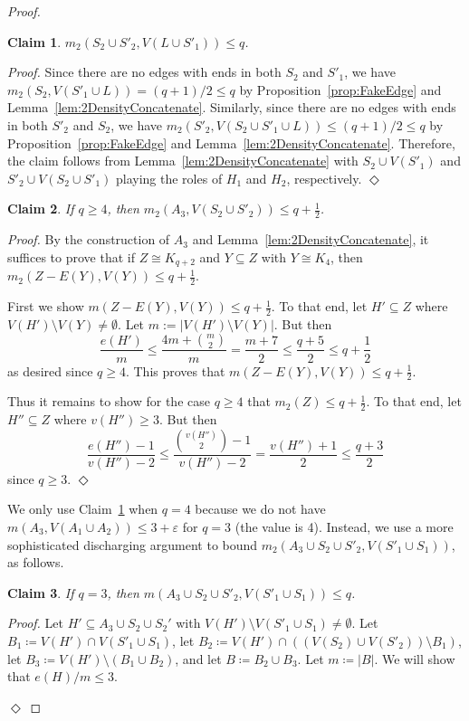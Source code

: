 \documentclass[11pt]{article}
\numberwithin{equation}{section}
\newcommand{\eps}{\varepsilon}
\newcounter{i}
\theoremstyle{plain}
\newtheorem{claim}{Claim}[thm]
\newenvironment{proofclaim}[1][]%
{\noindent \emph{Proof.} {}{#1}{}}{\hfill
	$\Diamond$\vspace{1em}}
\theoremstyle{plain} %
\theoremstyle{definition}
\begin{document}
\begin{proof}
\begin{claim}\label{cl:S_2andS'_2}
    $m_2(S_2 \cup S'_2, V(L \cup S'_1)) \leq q$.  
\end{claim}
\begin{proofclaim}
    Since there are no edges with ends in both $S_2$ and $S'_1$, we have $m_2(S_2, V(S'_1 \cup L)) = (q + 1)/2 \leq q$ by Proposition~\ref{prop:FakeEdge} and Lemma~\ref{lem:2DensityConcatenate}.
    Similarly, since there are no edges with ends in both $S'_2$ and $S_2$, we have $m_2(S'_2, V(S_2 \cup S'_1 \cup L)) \leq (q + 1)/2 \leq q$ by Proposition~\ref{prop:FakeEdge} and Lemma~\ref{lem:2DensityConcatenate}.
    Therefore, the claim follows from Lemma~\ref{lem:2DensityConcatenate} with $S_2 \cup V(S'_1)$ and $S'_2 \cup V(S_2 \cup S'_1)$ playing the roles of $H_1$ and $H_2$, respectively.
\end{proofclaim}

\begin{claim}\label{cl:A_3}
    If $q \geq 4$, then $m_2(A_3, V(S_2 \cup S'_2)) \leq q + \frac{1}{2}$.
\end{claim}
\begin{proofclaim}
    By the construction of $A_3$ and Lemma~\ref{lem:2DensityConcatenate}, it suffices to prove that if $Z\cong K_{q+2}$ and $Y\subseteq Z$ with $Y\cong K_4$, then $m_2(Z-E(Y),V(Y))\le q+\frac{1}{2}$. 

    First we show $m(Z-E(Y),V(Y))\le q+\frac{1}{2}$. To that end, let $H'\subseteq Z$ where $V(H')\setminus V(Y)\ne \emptyset$. Let $m:= |V(H')\setminus V(Y)|$. But then 
$$\frac{e(H')}{m} \le \frac{4m+\binom{m}{2}}{m} = \frac{m+7}{2} \le \frac{q+5}{2} \le q+\frac{1}{2}$$
as desired since $q\ge 4$. This proves that $m(Z-E(Y),V(Y))\le q+\frac{1}{2}$.

Thus it remains to show for the case $q\ge 4$ that $m_2(Z)\le q+\frac{1}{2}$. To that end, let $H''\subseteq Z$ where $v(H'')\ge 3$. But then 
$$\frac{e(H'')-1}{v(H'')-2} \le \frac{\binom{v(H'')}{2}-1}{v(H'')-2} = \frac{v(H'')+1}{2} \le \frac{q+3}{2}$$
since $q\ge 3$.
\end{proofclaim}

We only use Claim~\ref{cl:S_2andS'_2} when $q = 4$ because we do not have $m(A_3, V(A_1 \cup A_2)) \leq 3 + \eps$ for $q = 3$ (the value is 4).  Instead, we use a more sophisticated discharging argument to bound $m_2(A_3 \cup S_2 \cup S'_2, V(S'_1 \cup S_1))$, as follows.

\begin{claim}\label{cl:rooted-densityA_3andS_2andS'_2}
    If $q = 3$, then $m(A_3 \cup S_2 \cup S'_2, V(S'_1 \cup S_1)) \leq q$.
\end{claim}
\begin{proofclaim}
    Let $H'\subseteq A_3\cup S_2 \cup S_2'$ with $V(H')\setminus V(S'_1 \cup S_1) \neq \emptyset$.  Let $B_1 \coloneqq V(H') \cap V(S'_1 \cup S_1)$, let $B_2 \coloneqq V(H') \cap ((V(S_2) \cup V(S'_2)) \setminus B_1)$, let $B_3 \coloneqq V(H') \setminus (B_1 \cup B_2)$, and let $B \coloneqq B_2 \cup B_3$.  Let $m \coloneqq |B|$.  We will show that $e(H) / m \leq 3$.  


\end{proofclaim}
\end{proof}
\end{document}
